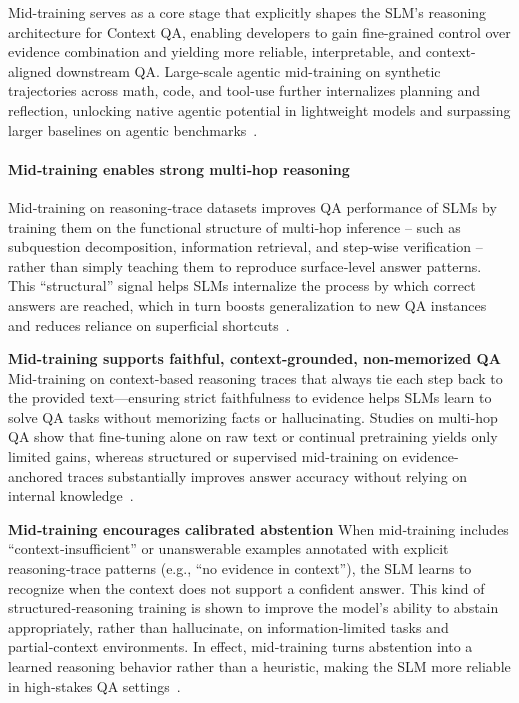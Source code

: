 \documentclass{llmxive}
\begin{document}
Mid-training serves as a core stage that explicitly shapes the SLM's reasoning architecture for Context QA, enabling developers to gain fine-grained control over evidence combination and yielding more reliable, interpretable, and context-aligned downstream QA. Large-scale agentic mid-training on synthetic trajectories across math, code, and tool-use further internalizes planning and reflection, unlocking native agentic potential in lightweight models and surpassing larger baselines on agentic benchmarks~\citep{pleias,youtu}.

\paragraph{Mid‑training enables strong multi‑hop reasoning} 
Mid‑training on reasoning‑trace datasets improves QA performance of SLMs by training them on the functional structure of multi‑hop inference -- such as subquestion decomposition, information retrieval, and step‑wise verification -- rather than simply teaching them to reproduce surface‑level answer patterns. This ``structural'' signal helps SLMs internalize the process by which correct answers are reached, which in turn boosts generalization to new QA instances and reduces reliance on superficial shortcuts~\citep{lee-hockenmaier-2025-evaluating,liang2026longdocument}.

\textbf{Mid-training supports faithful, context-grounded, non-memorized QA} Mid-training on context-based reasoning traces that always tie each step back to the provided text—ensuring strict faithfulness to evidence helps SLMs learn to solve QA tasks without memorizing facts or hallucinating. Studies on multi-hop QA show that fine-tuning alone on raw text or continual pretraining yields only limited gains, whereas structured or supervised mid-training on evidence-anchored traces substantially improves answer accuracy without relying on internal knowledge~\citep{ren2026sinbenchtracingnativeevidence,li-etal-2024-teaching}.

\textbf{Mid‑training encourages calibrated abstention} When mid‑training includes ``context‑insufficient'' or unanswerable examples annotated with explicit reasoning‑trace patterns (e.g., ``no evidence in context''), the SLM learns to recognize when the context does not support a confident answer. This kind of structured‑reasoning training is shown to improve the model’s ability to abstain appropriately, rather than hallucinate, on information‑limited tasks and partial‑context environments. In effect, mid‑training turns abstention into a learned reasoning behavior rather than a heuristic, making the SLM more reliable in high‑stakes QA settings~\citep{zhou2026when,wen-etal-2024-characterizing}.
\end{document}
